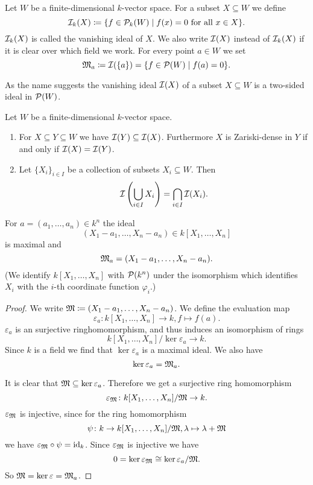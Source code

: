 \begin{defi}
 Let $W$ be a finite-dimensional $k$-vector space. For a subset $X \subseteq W$ we define
 \[
  \mathcal{I}_k(X) \coloneqq \{ f \in \mathcal{P}_k(W) \mid f(x) = 0 \text{ for all } x \in X \}.
 \]
 $\mathcal{I}_k(X)$ is called the vanishing ideal of $X$. We also write $\mathcal{I}(X)$ instead of $\mathcal{I}_k(X)$ if it is clear over which field we work.
 For every point $a \in W$ we set
 \[
  \mathfrak{M}_a \coloneqq \mathcal{I}(\{a\}) = \{f \in \mathcal{P}(W) \mid f(a) = 0\}.
 \]
\end{defi}


\begin{rem}
 As the name suggests the vanishing ideal $\mathcal{I}(X)$ of a subset $X \subseteq W$ is a two-sided ideal in $\mathcal{P}(W)$.
\end{rem}


\begin{rem}
 Let $W$ be a finite-dimensional $k$-vector space.
 \begin{enumerate}[label=\emph{\alph*)},leftmargin=*]
  \item
   For $X \subseteq Y \subseteq W$ we have $\mathcal{I}(Y) \subseteq \mathcal{I}(X)$. Furthermore $X$ is Zariski-dense in $Y$ if and only if $\mathcal{I}(X) = \mathcal{I}(Y)$.
  \item
   Let $\{X_i\}_{i \in I}$ be a collection of subsets $X_i \subseteq W$. Then
   \[
    \mathcal{I}\left( \bigcup_{i \in I} X_i \right) = \bigcap_{i \in I} \mathcal{I}(X_i).
   \]
 \end{enumerate}
\end{rem}


\begin{lem}
 For $a = (a_1, \dotsc, a_n) \in k^n$ the ideal
 \[
  (X_1 - a_1, \dotsc, X_n - a_n) \in k[X_1, \dotsc, X_n]
 \]
 is maximal and
 \[
  \mathfrak{M}_a = (X_1 - a_1, \dotsc, X_n - a_n).
 \]
 (We identify $k[X_1, \dotsc, X_n]$ with $\mathcal{P}(k^n)$ under the isomorphism which identifies $X_i$ with the $i$-th coordinate function $\varphi_i$.)
\end{lem}
\begin{proof}
 We write $\mathfrak{M} \coloneqq (X_1 - a_1, \dotsc, X_n - a_n)$. We define the evaluation map
 \[
  \varepsilon_a \colon k[X_1, \dotsc, X_n] \to k, f \mapsto f(a).
 \]
 $\varepsilon_a$ is an surjective ringhomomorphism, and thus induces an isomorphism of rings
 \[
  k[X_1, \dotsc, X_n]/\ker \varepsilon_a \to k.
 \]
 Since $k$ is a field we find that $\ker \varepsilon_a$ is a maximal ideal. We also have
 \[
  \ker \varepsilon_a = \mathfrak{M}_a.
 \]
 
 It is clear that $\mathfrak{M} \subseteq \ker \varepsilon_a$. Therefore we get a surjective ring homomorphism
 \[
  \varepsilon_\mathfrak{M} \colon k[X_1, \dotsc, X_n]/\mathfrak{M} \to k.
 \]
 $\varepsilon_\mathfrak{M}$ is injective, since for the ring homomorphism
 \[
  \psi \colon k \to k[X_1, \dotsc, X_n]/\mathfrak{M}, \lambda \mapsto \lambda + \mathfrak{M}
 \]
 we have $\varepsilon_\mathfrak{M} \circ \psi = \operatorname{id}_k$. Since $\varepsilon_\mathfrak{M}$ is injective we have
 \[
  0 = \ker \varepsilon_\mathfrak{M} \cong \ker \varepsilon_a / \mathfrak{M}.
 \]
 So $\mathfrak{M} = \ker \varepsilon = \mathfrak{M}_a$.
\end{proof}


